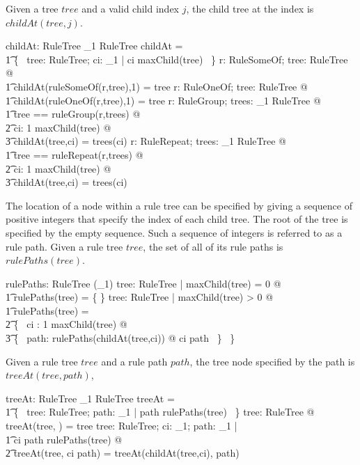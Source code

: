 \documentclass{article}
\begin{document}
Given a tree $tree$ and a valid child index $j$, the child tree at the index is $childAt(tree,j)$.
\begin{axdef}
	childAt: RuleTree \cross \nat_1 \pfun RuleTree
\where
	\dom childAt = \\
\t1		\{~ tree: RuleTree; ci: \nat_1 | ci \leq maxChild(tree) ~\}
\also
	\forall r: RuleSomeOf; tree: RuleTree @ \\
\t1		childAt(ruleSomeOf(r,tree),1) = tree
\also
	\forall r: RuleOneOf; tree: RuleTree @ \\
\t1		childAt(ruleOneOf(r,tree),1) = tree
\also
	\forall r: RuleGroup; trees: \seq_1 RuleTree @ \\
\t1		\LET tree == ruleGroup(r,trees) @ \\
\t2			\forall ci: 1 \upto maxChild(tree) @ \\
\t3				childAt(tree,ci) = trees(ci)
\also
	\forall r: RuleRepeat; trees: \seq_1 RuleTree @ \\
\t1		\LET tree == ruleRepeat(r,trees) @ \\
\t2			\forall ci: 1 \upto maxChild(tree) @ \\
\t3				childAt(tree,ci) = trees(ci)
\end{axdef}

The location of a node within a rule tree can be specified by giving a sequence of positive integers that specify the index of each child tree.
The root of the tree is specified by the empty sequence.
Such a sequence of integers is referred to as a rule path.
Given a rule tree $tree$, the set of all of its rule paths is $rulePaths(tree)$.
\begin{axdef}
	rulePaths: RuleTree \fun \finset (\seq \nat_1)
\where
	\forall tree: RuleTree | maxChild(tree) = 0 @ \\
\t1		rulePaths(tree) = \{ \langle \rangle \}
\also
	\forall tree: RuleTree | maxChild(tree) > 0 @ \\
\t1		rulePaths(tree) = \\
\t2			\bigcup \{~ ci : 1 \upto maxChild(tree) @ \\
\t3				\{~ path: rulePaths(childAt(tree,ci)) @ \langle ci \rangle \cat path ~\} ~\}
\end{axdef}

Given a rule tree $tree$ and a rule path $path$, the tree node specified by the path is $treeAt(tree,path)$,
\begin{axdef}
	treeAt: RuleTree \cross \seq \nat_1 \pfun RuleTree
\where
	\dom treeAt = \\
\t1		\{~ tree: RuleTree; path: \seq \nat_1 | path \in rulePaths(tree) ~\}
\also
	\forall tree: RuleTree @ treeAt(tree, \langle \rangle) = tree
\also
	\forall tree: RuleTree; ci: \nat_1; path: \seq \nat_1 | \\
\t1		\langle ci \rangle \cat path \in rulePaths(tree) @ \\
\t2			treeAt(tree, \langle ci \rangle \cat path) = treeAt(childAt(tree,ci), path)
\end{axdef}
\end{document}
